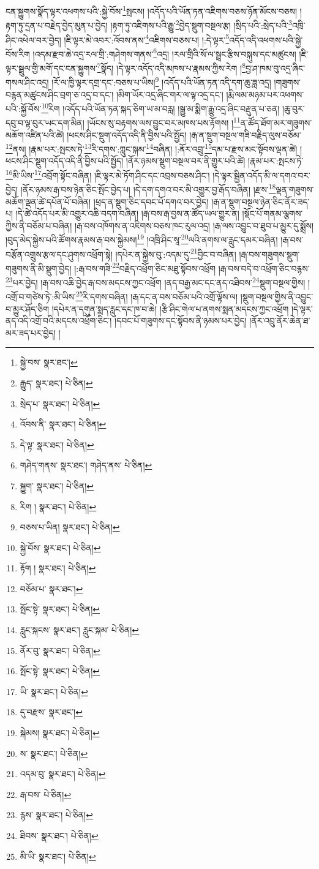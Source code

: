 ངན་སྐྱུགས་སྣོད་ལྟར་འཕགས་པའི་:སྐྱེ་བོས་\footnote{སྐྱེ་བས་  སྣར་ཐང་། }སྤངས། །འདོད་པའི་ཡོན་ཏན་འཇིགས་བཅས་ཉོན་མོངས་བཅས། །རྟག་ཏུ་དྲན་པ་བརྗེད་བྱེད་མུན་པ་བྱེད། །རྟག་ཏུ་འཇིགས་པའི་རྒྱུ་\footnote{རྒྱུད་  སྣར་ཐང་།  པེ་ཅིན། }བྱེད་སྡུག་བསྔལ་རྩ། །སྲིད་པའི་:སྲེད་པའི་\footnote{སྲེད་པ་  སྣར་ཐང་།  པེ་ཅིན། }འཁྲི་ཤིང་འཕེལ་བར་བྱེད། །ཇི་ལྟར་མེ་འབར་:འོབས་ནས་\footnote{འོབས་ནི་  སྣར་ཐང་།  པེ་ཅིན། }འཇིགས་བཅས་པ། །:དེ་ལྟར་\footnote{དེ་ལྟ་  སྣར་ཐང་།  པེ་ཅིན། }འདོད་འདི་འཕགས་པའི་སྐྱེ་བོས་རིག །འདམ་རྫབ་ཆེ་འདྲ་རལ་གྲི་:གཤེགས་གནས་\footnote{གཤེད་གནས་  སྣར་ཐང་། གཤེད་ནས་  པེ་ཅིན། }འདྲ། །རལ་གྲིའི་སོ་ལ་སྦྲང་རྩིས་བསྐུས་དང་མཚུངས། །ཇི་ལྟར་སྦྲུལ་གྱི་མགོ་དང་ངན་སྐྱུགས་\footnote{སྐྱུག་  སྣར་ཐང་།  པེ་ཅིན། }སྣོད། །དེ་ལྟར་འདོད་འདི་མཁས་པ་རྣམས་ཀྱིས་རེག །\footnote{རིག །  སྣར་ཐང་།  པེ་ཅིན། }བྱ་ཤ་ཁམ་བུ་འདྲ་ཞིང་གསལ་ཤིང་འདྲ། །རོ་ལ་ཁྱི་ལྟར་དགྲ་དང་:བཅས་པ་ཡིས།\footnote{བཅས་པ་ཡིན།  སྣར་ཐང་།  པེ་ཅིན། } །འདོད་པའི་ཡོན་ཏན་འདི་དག་ཆུ་ཟླ་འདྲ། །གཟུགས་བརྙན་མཚུངས་ཤིང་བྲག་ཅ་འདྲ་བ་དང་། །མིག་ཡོར་འདྲ་ཞིང་གར་ལ་ལྟ་འདྲ་དང་། །རྨི་ལམ་མཉམ་པར་འཕགས་པའི་:སྐྱོ་བོས་\footnote{སྐྱེ་བོས་  སྣར་ཐང་།  པེ་ཅིན། }རིག །འདོད་པའི་ཡོན་ཏན་སྐད་ཅིག་ཡ་མ་བརླ། །སྒྱུ་མ་སྨིག་རྒྱུ་འདྲ་ཞིང་བརྫུན་པ་ཅན། །ཆུ་བུར་དབུ་བ་ལྟ་བུར་ཡང་དག་མིན། །ཡོངས་སུ་བརྟགས་ལས་བྱུང་བར་མཁས་པས་རྟོགས། །\footnote{རྟོག །  སྣར་ཐང་།  པེ་ཅིན། }ན་ཚོད་ཐོག་མར་གཟུགས་མཆོག་འཛིན་པའི་ཚེ། །ཕངས་ཤིང་སྡུག་འདོད་འདི་ནི་བྱིས་པའི་སྤྱོད། །རྒ་ན་སྡུག་བསྔལ་གཟི་བརྗིད་ལུས་བཅོམ་\footnote{བཅོམ་པ་  སྣར་ཐང་། }ནས། །རྣམ་པར་:སྤངས་ཏེ་\footnote{སྤོང་སྟེ་  སྣར་ཐང་།  པེ་ཅིན། }རི་དགས་:ཀླུང་སྐམ་\footnote{རླུང་སྐངས་  སྣར་ཐང་། རླུང་སྐམ་  པེ་ཅིན། }བཞིན། །:ནོར་འབྲུ་\footnote{ནོར་བུ་  སྣར་ཐང་།  པེ་ཅིན། }དམ་པ་རྫས་མང་སྟོབས་ལྡན་ཚེ། །ཕངས་ཤིང་སྡུག་འདོད་འདི་ནི་བྱིས་པའི་སྤྱོད། །ནོར་ཉམས་སྡུག་བསྔལ་བར་ནི་གྱུར་པའི་ཚེ། །རྣམ་པར་:སྤངས་ཏེ་\footnote{སྤོང་སྟེ་  སྣར་ཐང་།  པེ་ཅིན། }མི་ཡིས་\footnote{ཡི་  སྣར་ཐང་།  པེ་ཅིན། }འབྲོག་སྟོང་བཞིན། །ཇི་ལྟར་མེ་ཏོག་ཤིང་དང་འབྲས་བཅས་ཤིང་། །དེ་ལྟར་སྦྱིན་འདོད་མི་ལ་དགའ་བར་བྱེད། །ནོར་ཉམས་རྒ་བས་ཉེན་ཅིང་སྤོང་བྱེད་པ། །དེ་དག་དགའ་བར་མི་འགྱུར་བྱ་རྒོད་བཞིན། །རྫས་\footnote{དུ་བརྫས་  སྣར་ཐང་། }ལྡན་གཟུགས་མཆོག་ལྡན་ཚེ་དཔོན་པོ་བཞིན། །ཕྲད་ན་སྡུག་ཅིང་དབང་པོ་དགའ་བར་བྱེད། །རྒ་ན་སྡུག་བསྔལ་ཉེན་ཅིང་ནོར་ཟད་པ། །དེ་ཚེ་འདོད་པར་མི་འགྱུར་འཆི་བདག་བཞིན། །རྒ་བས་རྒ་བྱས་ན་ཚོད་ཡལ་གྱུར་ན། །སྡོང་པོ་གནམ་ལྕགས་ཀྱིས་ནི་བཅོམ་པ་བཞིན། །རྒ་བས་འཁོགས་ན་འཇིགས་བཅས་ཁང་རུལ་འདྲ། །རྒ་ལས་འབྱུང་བ་ཐུབ་པ་མྱུར་དུ་སྨྲོས། །བུད་མེད་སྐྱེས་པའི་ཚོགས་རྣམས་རྒ་བས་སྐྱེམས།\footnote{སྐེམས།  སྣར་ཐང་།  པེ་ཅིན། } །འཁྲི་ཤིང་སཱ་\footnote{ས་  སྣར་ཐང་།  པེ་ཅིན། }ལའི་ནགས་ལ་རླུང་དམར་བཞིན། །རྒ་བས་བརྩོན་འགྲུས་རྩལ་དང་ཤུགས་འཕྲོག་སྟེ། །དཔེར་ན་སྐྱེས་བུ་:འདམ་དུ་\footnote{འདམ་བུ་  སྣར་ཐང་།  པེ་ཅིན། }བྱིང་བ་བཞིན། །རྒ་བས་གཟུགས་སྡུག་གཟུགས་ནི་མི་སྡུག་བྱེད། །:རྒ་བས་གཟི་\footnote{རྒ་བས་  པེ་ཅིན། }བརྗིད་འཕྲོག་ཅིང་མཐུ་སྟོབས་འཕྲོག །རྒ་བས་བདེ་བ་འཕྲོག་ཅིང་བརྙས་\footnote{རྙས་  སྣར་ཐང་།  པེ་ཅིན། }པར་བྱེད། །རྒ་བས་འཆི་བྱེད་རྒ་བས་མདངས་ཀྱང་འཕྲོག །ནད་བརྒྱ་མང་དང་ནད་འཐིབས་\footnote{ཐིབས་  སྣར་ཐང་།  པེ་ཅིན། }སྡུག་བསྔལ་གྱིས། །འགྲོ་བ་གཙེས་ཏེ་:མི་ཡིས་\footnote{མི་ཡི་  སྣར་ཐང་།  པེ་ཅིན། }རི་དགས་བཞིན། །རྒ་དང་ན་བས་བཅོམ་པའི་འགྲོ་ལྟོས་ལ། །སྡུག་བསྔལ་གྱིས་ནི་འབྱུང་བ་མྱུར་ཤོད་ཅིག །དཔེར་ན་དགུན་སྨད་རླུང་དང་ཁ་བ་ཆེ། །རྩི་ཤིང་གེལ་པ་ནགས་སྨན་མདངས་ཀྱང་འཕྲོག །དེ་ལྟར་ནད་འདི་འགྲོ་བའི་མདངས་འཕྲོག་ཅིང་། །དབང་པོ་གཟུགས་དང་སྟོབས་ནི་ཉམས་པར་བྱེད། །ནོར་འབྲུ་ནོར་ཆེན་ཐ་མར་ཟད་པར་བྱེད། །
